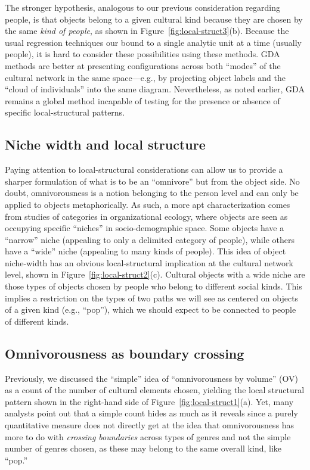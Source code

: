 \documentclass[preprint,12pt,authoryear]{elsarticle}
\begin{document}
The stronger hypothesis, analogous to our previous consideration regarding people, is that objects belong to a given cultural kind because they are chosen by the same \textit{kind of people}, as shown in Figure~\ref{fig:local-struct3}(b). Because the usual regression techniques our bound to a single analytic unit at a time (usually people), it is hard to consider these possibilities using these methods. GDA methods are better at presenting configurations across both ``modes'' of the cultural network in the same space---e.g., by projecting object labels and the ``cloud of individuals'' into the same diagram. Nevertheless, as noted earlier, GDA remains a global method incapable of testing for the presence or absence of specific local-structural patterns. 

\subsection{Niche width and local structure}
Paying attention to local-structural considerations can allow us to provide a sharper formulation of what is to be an ``omnivore'' but from the object side. No doubt, omnivorousness is a notion belonging to the person level and can only be applied to objects metaphorically. As such, a more apt characterization comes from studies of categories in organizational ecology, where objects are seen as occupying specific ``niches'' in socio-demographic space. Some objects have a ``narrow'' niche (appealing to only a delimited category of people), while others have a ``wide'' niche (appealing to many kinds of people). This idea of object niche-width has an obvious local-structural implication at the cultural network level, shown in Figure~\ref{fig:local-struct2}(c). Cultural objects with a wide niche are those types of objects chosen by people who belong to different social kinds. This implies a restriction on the types of two paths we will see as centered on objects of a given kind (e.g., ``pop''), which we should expect to be connected to people of different kinds. 

\subsection{Omnivorousness as boundary crossing}
Previously, we discussed the ``simple'' idea of ``omnivorousness by volume'' (OV) as a count of the number of cultural elements chosen, yielding the local structural pattern shown in the right-hand side of Figure~\ref{fig:local-struct1}(a). Yet, many analysts point out that a simple count hides as much as it reveals since a purely quantitative measure does not directly get at the idea that omnivorousness has more to do with \textit{crossing boundaries} across types of genres and not the simple number of genres chosen, as these may belong to the same overall kind, like ``pop.'' 
\end{document}
